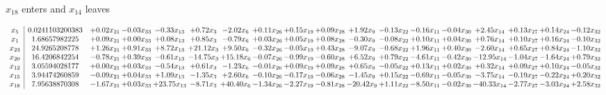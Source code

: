 \documentclass[9pt]{article}
\begin{document}
 $ x_{18} $ enters and $ x_{14} $ leaves 

 \[\begin{array}{c| c c@{\hskip 2pt} c@{\hskip 2pt} c@{\hskip 2pt} c@{\hskip 2pt} c@{\hskip 2pt} c@{\hskip 2pt} c@{\hskip 2pt} c@{\hskip 2pt} c@{\hskip 2pt} c@{\hskip 2pt} c@{\hskip 2pt} c@{\hskip 2pt} c@{\hskip 2pt} c@{\hskip 2pt} c@{\hskip 2pt} c@{\hskip 2pt} }
 x_{5}   &  0.0241103200383 & +  0.02 x_{21} & -0.03 x_{33} & -0.33 x_{13} & +  0.72 x_{3} & -2.02 x_{6} & +  0.11 x_{26} & +  0.15 x_{19} & +  0.09 x_{28} & +  1.92 x_{9} & -0.13 x_{22} & -0.16 x_{11} & -0.04 x_{30} & +  2.45 x_{14} & +  0.13 x_{27} & +  0.14 x_{24} & -0.12 x_{32}\\
 x_{1}   &  1.68657982225 & +  0.09 x_{21} & +  0.00 x_{33} & +  0.08 x_{13} & +  0.85 x_{3} & -0.79 x_{6} & +  0.03 x_{26} & +  0.05 x_{19} & +  0.08 x_{28} & -0.30 x_{9} & -0.08 x_{22} & +  0.10 x_{11} & +  0.04 x_{30} & +  0.76 x_{14} & +  0.10 x_{27} & +  0.16 x_{24} & -0.10 x_{32}\\
 x_{23}   &  24.9265208778 & +  1.26 x_{21} & +  0.91 x_{33} & +  8.72 x_{13} & + 21.12 x_{3} & +  9.50 x_{6} & -0.32 x_{26} & -0.05 x_{19} & +  0.43 x_{28} & -9.07 x_{9} & -0.68 x_{22} & +  1.96 x_{11} & +  0.40 x_{30} & -2.60 x_{14} & +  0.65 x_{27} & +  0.84 x_{24} & -1.10 x_{32}\\
 x_{20}   &  16.4206842254 & -0.78 x_{21} & +  0.39 x_{33} & -0.61 x_{13} & -14.75 x_{3} & + 15.18 x_{6} & -0.07 x_{26} & -0.99 x_{19} & -0.60 x_{28} & +  6.52 x_{9} & +  0.79 x_{22} & -4.61 x_{11} & -0.42 x_{30} & -12.95 x_{14} & -1.04 x_{27} & -1.64 x_{24} & +  0.79 x_{32}\\
 x_{12}   &  3.05594028177 & +  0.00 x_{21} & +  0.03 x_{33} & -0.54 x_{13} & +  0.61 x_{3} & -1.23 x_{6} & -0.01 x_{26} & +  0.09 x_{19} & +  0.09 x_{28} & +  0.65 x_{9} & -0.05 x_{22} & +  0.13 x_{11} & +  0.02 x_{30} & +  0.32 x_{14} & +  0.09 x_{27} & +  0.10 x_{24} & -0.05 x_{32}\\
 x_{15}   &  3.94474260859 & -0.09 x_{21} & +  0.04 x_{33} & +  1.09 x_{13} & -1.35 x_{3} & +  2.60 x_{6} & -0.10 x_{26} & -0.17 x_{19} & -0.06 x_{28} & -1.45 x_{9} & +  0.15 x_{22} & -0.69 x_{11} & -0.05 x_{30} & -3.75 x_{14} & -0.19 x_{27} & -0.22 x_{24} & +  0.20 x_{32}\\
 x_{18}   &  7.95638870308 & -1.67 x_{21} & +  0.03 x_{33} & + 23.75 x_{13} & -8.71 x_{3} & + 40.40 x_{6} & -1.34 x_{26} & -2.27 x_{19} & -0.81 x_{28} & -20.42 x_{9} & +  1.11 x_{22} & -8.50 x_{11} & -0.02 x_{30} & -40.33 x_{14} & -2.77 x_{27} & -3.03 x_{24} & +  2.58 x_{32}\\

\end{array}\]
\end{document}
